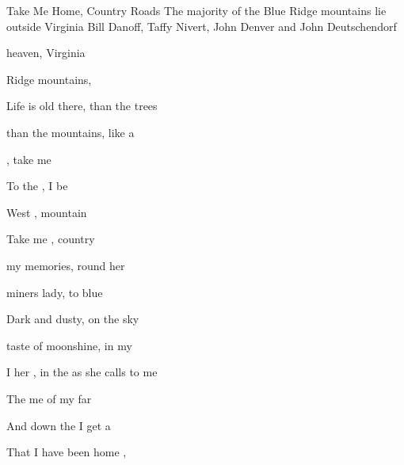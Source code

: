 \begin{SBSong}{Take Me Home, Country Roads}
  {The majority of the Blue Ridge mountains lie outside Virginia}
  {Bill Danoff, Taffy Nivert, John Denver and John Deutschendorf}
  \begin{SBVerse}
     heaven,  Virginia
    
     Ridge mountains,  
    
    Life is old there,  than the trees
    
     than the mountains,  like a 
  \end{SBVerse}
  \begin{SBChorus}
    , take me 
    
	To the , I be
	
	West , mountain 
	
	Take me , country 
  \end{SBChorus}
  \begin{SBVerse}
     my memories,  round her
    
     miners lady,  to blue 
    
    Dark and dusty,  on the sky
    
     taste of moonshine,  in my 
  \end{SBVerse}
  \begin{SBVerse}
    I  her , in the  as she calls to me
    
    The   me of my  far 
    
    And  down the  I get a 
    
    That I  have been home ,  
  \end{SBVerse}
\end{SBSong}
